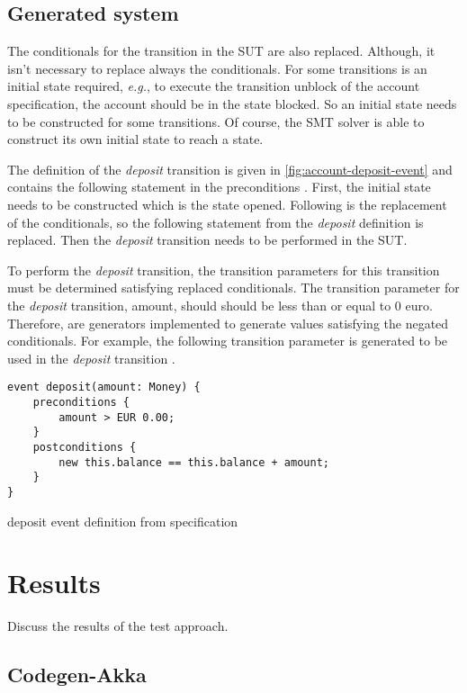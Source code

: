 \subsection{Generated system}
The conditionals for the transition in the SUT are also replaced.
Although, it isn't necessary to replace always the conditionals. For some
transitions is an initial state required, \textit{e.g.}, to execute the transition unblock
of the account specification, the account should be in the state blocked. So an
initial state needs to be constructed for some transitions. Of course, the SMT
solver is able to construct its own initial state to reach a state.

The definition of the \textit{deposit} transition is given in
\autoref{fig:account-deposit-event} and contains the following statement in the
preconditions . First, the initial state needs to be
constructed which is the state opened. Following is the replacement of the conditionals, so the
following statement from the \textit{deposit} definition  is
replaced. Then the \textit{deposit} transition needs to be performed in the SUT.

To perform the \textit{deposit} transition, the transition parameters for this
transition must be determined satisfying replaced conditionals. The transition
parameter for the \textit{deposit} transition, amount, should should be less
than or equal to 0 euro. Therefore, are generators implemented to generate
values satisfying the negated conditionals. For example, the following
transition parameter is generated to be used in the \textit{deposit} transition
.

\begin{sourcecode}[h!]
\begin{lstlisting}[]
event deposit(amount: Money) {
	preconditions {
		amount > EUR 0.00;
	}
	postconditions {
		new this.balance == this.balance + amount;
	}
}
\end{lstlisting}
\caption{deposit event definition from specification}\label{fig:account-deposit-event}
\end{sourcecode}

\section{Results}
Discuss the results of the test approach.

\subsection{Codegen-Akka}


